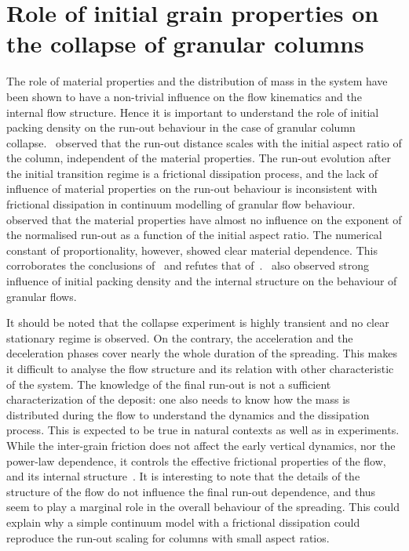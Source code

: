 \section{Role of initial grain properties on the collapse of granular columns}

The role of material properties and the distribution of mass in the system have 
been shown to have a non-trivial influence on the flow kinematics and the 
internal flow structure. Hence it is important to understand the role of 
initial packing density on the run-out behaviour in the case of granular column 
collapse.~\citet{Lube2005} observed that the run-out distance scales with the 
initial aspect ratio of the column, independent of the material properties. The 
run-out evolution after the initial transition regime is a frictional 
dissipation process, and the lack of influence of material properties on the 
run-out behaviour is inconsistent with frictional dissipation in continuum 
modelling of granular flow behaviour.~\citet{Balmforth2005} observed that the 
material properties have almost no influence on the exponent of the normalised 
run-out as a function of the initial aspect ratio. The numerical constant of 
proportionality, however, showed clear material dependence. This corroborates 
the conclusions of~\citet{Lajeunesse2004} and refutes that 
of~\citet{Lube2005}.~\citet{Daerr1999} also observed strong influence of 
initial packing density and the internal structure on the behaviour of 
granular flows. 


It should be noted that the collapse experiment is highly transient and no 
clear stationary regime is observed. On the contrary, the acceleration and the 
deceleration phases cover nearly the whole duration of the spreading. This 
makes it difficult to analyse the flow structure and its relation with other 
characteristic of the system. The knowledge of the final run-out is not a 
sufficient characterization of the deposit: one also needs to know how the mass 
is distributed during the flow to understand the dynamics and the dissipation 
process. This is expected to be true in natural contexts as well as in 
experiments. While the inter-grain friction does not affect the early vertical 
dynamics, nor the power-law dependence, it controls the effective frictional 
properties of the flow, and its internal structure~\citep{Staron2007a}. It is 
interesting to note that the details of the structure of the flow do not 
influence the final run-out dependence, and thus seem to play a marginal role 
in the overall behaviour of the spreading. This could explain why a simple 
continuum model with a frictional dissipation could reproduce the run-out 
scaling for columns with small aspect ratios.

